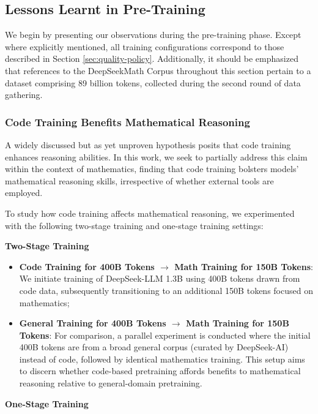 \begin{itemize}[topsep=0pt]
\begin{itemize}[topsep=0pt]
\subsection{Lessons Learnt in Pre-Training}

We begin by presenting our observations during the pre-training phase. Except where explicitly mentioned, all training configurations correspond to those described in Section \ref{sec:quality-policy}. Additionally, it should be emphasized that references to the DeepSeekMath Corpus throughout this section pertain to a dataset comprising 89 billion tokens, collected during the second round of data gathering.

\subsubsection{Code Training Benefits Mathematical Reasoning}

A widely discussed but as yet unproven hypothesis posits that code training enhances reasoning abilities. In this work, we seek to partially address this claim within the context of mathematics, finding that code training bolsters models' mathematical reasoning skills, irrespective of whether external tools are employed.

To study how code training affects mathematical reasoning, we experimented with the following two-stage training and one-stage training settings:

\textbf{Two-Stage Training}

\begin{itemize}[topsep=0pt]
    \item \textbf{Code Training for 400B Tokens $\rightarrow$ Math Training for 150B Tokens}: We initiate training of DeepSeek-LLM 1.3B using 400B tokens drawn from code data, subsequently transitioning to an additional 150B tokens focused on mathematics;
    \item \textbf{General Training for 400B Tokens $\rightarrow$ Math Training for 150B Tokens}: For comparison, a parallel experiment is conducted where the initial 400B tokens are from a broad general corpus (curated by DeepSeek-AI) instead of code, followed by identical mathematics training. This setup aims to discern whether code-based pretraining affords benefits to mathematical reasoning relative to general-domain pretraining.
\end{itemize}

\textbf{One-Stage Training}


\end{itemize}
\end{itemize}
